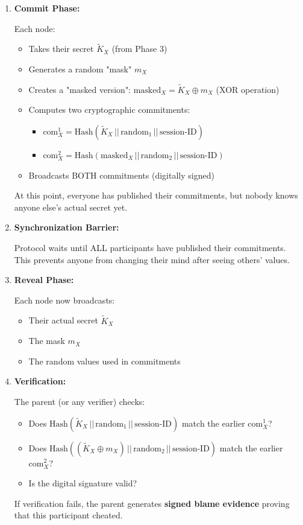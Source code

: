 \documentclass[12pt,a4paper]{report}
\begin{document}
\begin{enumerate}
\item \textbf{Commit Phase:}

Each node:
\begin{itemize}
\item Takes their secret $\widetilde{K}_X$ (from Phase 3)
\item Generates a random "mask" $m_X$
\item Creates a "masked version": $\text{masked}_X = \widetilde{K}_X \oplus m_X$ (XOR operation)
\item Computes two cryptographic commitments:
\begin{itemize}
\item $\text{com}^1_X = \text{Hash}(\widetilde{K}_X \,||\, \text{random}_1 \,||\, \text{session-ID})$
\item $\text{com}^2_X = \text{Hash}(\text{masked}_X \,||\, \text{random}_2 \,||\, \text{session-ID})$
\end{itemize}
\item Broadcasts BOTH commitments (digitally signed)
\end{itemize}

At this point, everyone has published their commitments, but nobody knows anyone else's actual secret yet.

\item \textbf{Synchronization Barrier:}

Protocol waits until ALL participants have published their commitments. This prevents anyone from changing their mind after seeing others' values.

\item \textbf{Reveal Phase:}

Each node now broadcasts:
\begin{itemize}
\item Their actual secret $\widetilde{K}_X$
\item The mask $m_X$
\item The random values used in commitments
\end{itemize}

\item \textbf{Verification:}

The parent (or any verifier) checks:
\begin{itemize}
\item Does $\text{Hash}(\widetilde{K}_X \,||\, \text{random}_1 \,||\, \text{session-ID})$ match the earlier $\text{com}^1_X$?
\item Does $\text{Hash}((\widetilde{K}_X \oplus m_X) \,||\, \text{random}_2 \,||\, \text{session-ID})$ match the earlier $\text{com}^2_X$?
\item Is the digital signature valid?
\end{itemize}

If verification fails, the parent generates \textbf{signed blame evidence} proving that this participant cheated.
\end{enumerate}
\end{document}
